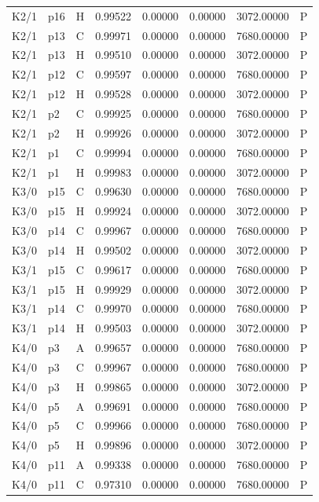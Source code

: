 \begin{longtable}{llllllll}
K2/1 & p16 & H & 0.99522 & 0.00000 & 0.00000 & 3072.00000 & P \\
K2/1 & p13 & C & 0.99971 & 0.00000 & 0.00000 & 7680.00000 & P \\
K2/1 & p13 & H & 0.99510 & 0.00000 & 0.00000 & 3072.00000 & P \\
K2/1 & p12 & C & 0.99597 & 0.00000 & 0.00000 & 7680.00000 & P \\
K2/1 & p12 & H & 0.99528 & 0.00000 & 0.00000 & 3072.00000 & P \\
K2/1 & p2 & C & 0.99925 & 0.00000 & 0.00000 & 7680.00000 & P \\
K2/1 & p2 & H & 0.99926 & 0.00000 & 0.00000 & 3072.00000 & P \\
K2/1 & p1 & C & 0.99994 & 0.00000 & 0.00000 & 7680.00000 & P \\
K2/1 & p1 & H & 0.99983 & 0.00000 & 0.00000 & 3072.00000 & P \\
K3/0 & p15 & C & 0.99630 & 0.00000 & 0.00000 & 7680.00000 & P \\
K3/0 & p15 & H & 0.99924 & 0.00000 & 0.00000 & 3072.00000 & P \\
K3/0 & p14 & C & 0.99967 & 0.00000 & 0.00000 & 7680.00000 & P \\
K3/0 & p14 & H & 0.99502 & 0.00000 & 0.00000 & 3072.00000 & P \\
K3/1 & p15 & C & 0.99617 & 0.00000 & 0.00000 & 7680.00000 & P \\
K3/1 & p15 & H & 0.99929 & 0.00000 & 0.00000 & 3072.00000 & P \\
K3/1 & p14 & C & 0.99970 & 0.00000 & 0.00000 & 7680.00000 & P \\
K3/1 & p14 & H & 0.99503 & 0.00000 & 0.00000 & 3072.00000 & P \\
K4/0 & p3 & A & 0.99657 & 0.00000 & 0.00000 & 7680.00000 & P \\
K4/0 & p3 & C & 0.99967 & 0.00000 & 0.00000 & 7680.00000 & P \\
K4/0 & p3 & H & 0.99865 & 0.00000 & 0.00000 & 3072.00000 & P \\
K4/0 & p5 & A & 0.99691 & 0.00000 & 0.00000 & 7680.00000 & P \\
K4/0 & p5 & C & 0.99966 & 0.00000 & 0.00000 & 7680.00000 & P \\
K4/0 & p5 & H & 0.99896 & 0.00000 & 0.00000 & 3072.00000 & P \\
K4/0 & p11 & A & 0.99338 & 0.00000 & 0.00000 & 7680.00000 & P \\
K4/0 & p11 & C & 0.97310 & 0.00000 & 0.00000 & 7680.00000 & P \\

\end{longtable}
